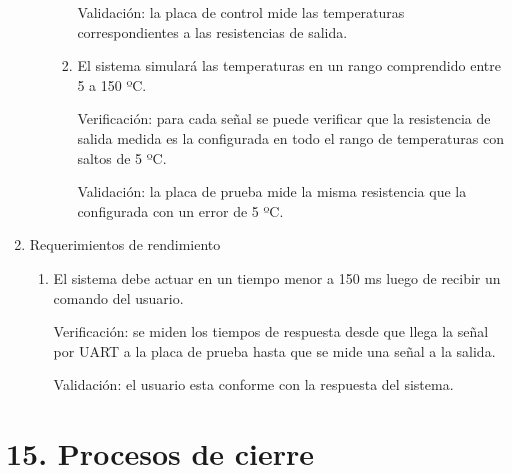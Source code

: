 \documentclass[
11pt, %
codirector, %
]{charter}
\begin{document}
\begin{enumerate}
\begin{enumerate}
\begin{enumerate}
			                  Validación: la placa de control mide las temperaturas correspondientes a las resistencias de salida.
			            \item El sistema simulará las temperaturas en un rango comprendido entre 5 a 150 ºC.

			                  Verificación: para cada señal se puede verificar que la resistencia de salida medida es la configurada en todo el rango de temperaturas con saltos de 5 ºC.

			                  Validación: la placa de prueba mide la misma resistencia que la configurada con un error de 5 ºC.
		            \end{enumerate}
	      \end{enumerate}
	\item Requerimientos de rendimiento
	      \begin{enumerate}
		      \item El sistema debe actuar en un tiempo menor a 150 ms luego de recibir un comando del usuario.

		            Verificación: se miden los tiempos de respuesta desde que llega la señal por UART a la placa de prueba hasta que se mide una señal a la salida.

		            Validación: el usuario esta conforme con la respuesta del sistema.
	      \end{enumerate}
\end{enumerate}

\section{15. Procesos de cierre}
\label{sec:cierre}
\end{document}
